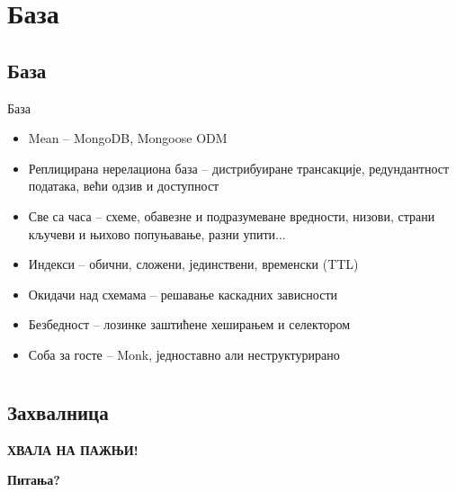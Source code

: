 \documentclass[hyperref={bookmarks=false}]{beamer}
\begin{document}
\section{База}
\subsection{База}
\begin{frame}{База}
\begin{itemize}
\item Mean -- MongoDB, Mongoose ODM

\item Реплицирана нерелациона база --  дистрибуиране трансакције, редундантност података, већи одзив и доступност

\item Све са часа -- схеме, обавезне и подразумеване вредности, низови, страни кључеви и њихово попуњавање, разни упити...

\item Индекси -- обични, сложени, јединствени, временски (TTL)

\item Окидачи над схемама -- решавање каскадних зависности

\item Безбедност -- лозинке заштићене хеширањем и селектором

\item Соба за госте -- Monk, једноставно али неструктурирано
\end{itemize}
\end{frame}

\section{}
\subsection{Захвалница}
\begin{frame}
\centering \LARGE
\textbf{ХВАЛА НА ПАЖЊИ!}

\textbf{Питања?}
\end{frame}
\end{document}
